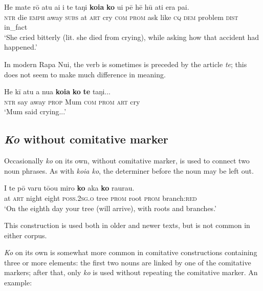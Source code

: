 \ea\label{ex:8.205}
\gll He mate rō atu {\ꞌ}ai {\ꞌ}i te taŋi \textbf{koia} \textbf{ko} {\ꞌ}ui pē hē hū {\ꞌ}ati era pa{\ꞌ}i. \\
\textsc{ntr} die \textsc{emph} away \textsc{subs} at \textsc{art} cry \textsc{com} \textsc{prom} ask like \textsc{cq} \textsc{dem} problem \textsc{dist} in\_fact \\

\glt
‘She cried bitterly (lit. she died from crying), while asking how that accident had happened.’ \textstyleExampleref{[R437.101]} 
\z

In modern Rapa Nui, the verb is sometimes is preceded by the article \textit{te}; this does not seem to make much difference in meaning.

\ea\label{ex:8.206}
\gll He kī atu a nua \textbf{koia} \textbf{ko} \textbf{te} taŋi...\\
\textsc{ntr} say away \textsc{prop} Mum \textsc{com} \textsc{prom} \textsc{art} cry\\

\glt 
‘Mum said crying...’ \textstyleExampleref{[R237.014]}\textstyleExampleref{} 
\z
{}

\subsection{\textit{Ko} without comitative marker}\label{sec:8.10.5}
Occasionally \textit{ko} on its own, without comitative marker, is used to connect two noun phrases. As with \textit{koia ko}, the determiner before the noun may be left out.

\ea\label{ex:8.207}
\gll {\ꞌ}I te pō varu tō{\ꞌ}ou miro \textbf{ko} aka \textbf{ko} raurau. \\
at \textsc{art} night eight \textsc{poss.2sg.o} tree \textsc{prom} root \textsc{prom} branch:\textsc{red} \\

\glt
‘On the eighth day your tree (will arrive), with roots and branches.’ \textstyleExampleref{[Mtx-7-18.003]}
\z

This construction is used both in older and newer texts, but is not common in either corpus.

\textit{Ko} on its own is somewhat more common in comitative constructions containing three or more elements: the first two nouns are linked by one of the comitative markers; after that, only \textit{ko} is used without repeating the comitative marker. An example:

